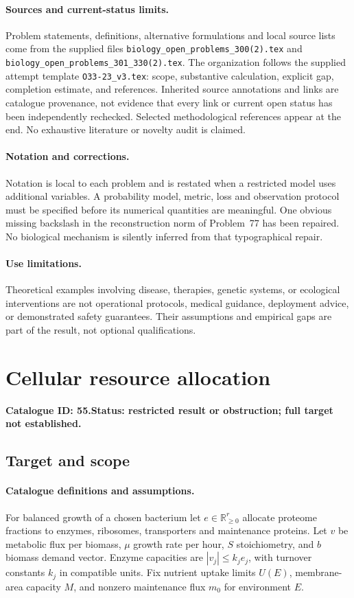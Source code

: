 \documentclass[11pt]{article}
\newcommand{\R}{\mathbb R}
\providecommand{\R}{\mathbb R}
\begin{document}
\paragraph{Sources and current-status limits.}
Problem statements, definitions, alternative formulations and local source lists
come from the supplied files
\texttt{biology\_open\_problems\_300(2).tex} and
\texttt{biology\_open\_problems\_301\_330(2).tex}.
The organization follows the supplied attempt template
\texttt{O33-23\_v3.tex}: scope, substantive calculation, explicit gap,
completion estimate, and references. Inherited source annotations and links are
catalogue provenance, not evidence that every link or current open status has
been independently rechecked. Selected methodological references appear at the
end. No exhaustive literature or novelty audit is claimed.

\paragraph{Notation and corrections.}
Notation is local to each problem and is restated when a restricted model uses
additional variables. A probability model, metric, loss and observation protocol
must be specified before its numerical quantities are meaningful. One obvious
missing backslash in the reconstruction norm of Problem~77 has been repaired.
No biological mechanism is silently inferred from that typographical repair.

\paragraph{Use limitations.}
Theoretical examples involving disease, therapies, genetic systems, or ecological
interventions are not operational protocols, medical guidance, deployment advice,
or demonstrated safety guarantees. Their assumptions and empirical gaps are part
of the result, not optional qualifications.

\setcounter{section}{54}
\section{Cellular resource allocation}
\label{prob:055}
\noindent\textbf{Catalogue ID: 55.}\quad \textbf{Status: restricted result or obstruction; full target not established.}
\subsection{Target and scope}
\paragraph{Catalogue definitions and assumptions.}
For balanced growth of a chosen bacterium let $e\in\R_{\ge0}^r$ allocate proteome fractions to enzymes, ribosomes, transporters and maintenance proteins. Let $v$ be metabolic flux per biomass, $\mu$ growth rate per hour, $S$ stoichiometry, and $b$ biomass demand vector. Enzyme capacities are $|v_j|\le k_j e_j$, with turnover constants $k_j$ in compatible units. Fix nutrient uptake limits $U(E)$, membrane-area capacity $M$, and nonzero maintenance flux $m_0$ for environment $E$.
\end{document}

